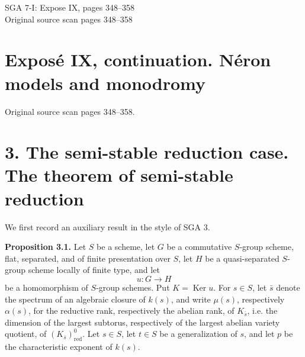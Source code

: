 \documentclass[11pt]{article}
\providecommand{\Ker}{\operatorname{Ker}}
\begin{document}
\begin{center}
{\Large SGA 7-I: Expose IX, pages 348--358}\\[0.35em]
{\large Original source scan pages 348--358}
\end{center}

\section*{Exposé IX, continuation. Néron models and monodromy}
\begin{center}
Original source scan pages 348--358.
\end{center}

\section*{3. The semi-stable reduction case. The theorem of semi-stable reduction}

We first record an auxiliary result in the style of SGA 3.

\textbf{Proposition 3.1.} Let \(S\) be a scheme, let \(G\) be a commutative \(S\)-group scheme, flat, separated, and of finite presentation over \(S\), let \(H\) be a quasi-separated \(S\)-group scheme locally of finite type, and let
\[
        u:G\longrightarrow H
\]
be a homomorphism of \(S\)-group schemes.  Put \(K=\Ker u\).  For \(s\in S\), let \(\bar s\) denote the spectrum of an algebraic closure of \(k(s)\), and write \(\mu(s)\), respectively \(\alpha(s)\), for the reductive rank, respectively the abelian rank, of \(K_{\bar s}\), i.e. the dimension of the largest subtorus, respectively of the largest abelian variety quotient, of \((K_{\bar s})^0_{\mathrm{red}}\).  Let \(s\in S\), let \(t\in S\) be a generalization of \(s\), and let \(p\) be the characteristic exponent of \(k(s)\).
\end{document}
